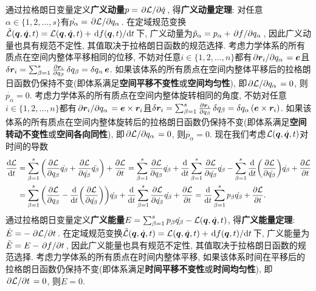 通过拉格朗日变量定义\textbf{广义动量}$ p=\pdv*{\mathcal{L}}{\dot{q}} $, 得\textbf{广义动量定理}: 对任意$ \alpha \in \{1,2,\ldots,s\} $有$ \dot{p_{\alpha}}=\pdv*{\mathcal{L}}{q_{\alpha}} $. 在定域规范变换$ \tilde{\mathcal{L}}(\vb*{q},\dot{\vb*{q}},t)=\mathcal{L}(\vb*{q},\dot{\vb*{q}},t)+\dv*{f(\vb*{q},t)}{t} $下, 广义动量为$ \tilde{p}_{\alpha}=p_{\alpha}+\pdv*{f}{q_{\alpha}} $, 因此广义动量也具有规范不定性, 其值取决于拉格朗日函数的规范选择. 考虑力学体系的所有质点在空间内整体平移相同的位移, 不妨对任意$ i \in \{1,2,\ldots,n\} $都有$ \pdv*{\vb*{r}_i}{q_{\alpha}}=\vb*{e} $且$ \var{\vb*{r}_i} = \sum_{\beta=1}^s \pdv{\vb*{r}_i}{q_{\beta}} \var{q_{\beta}} = \var{q_{\alpha}} \vb*{e} $. 如果该体系的所有质点在空间内整体平移后的拉格朗日函数仍保持不变(即体系满足\textbf{空间平移不变性}或\textbf{空间均匀性}), 即$ \pdv*{\mathcal{L}}{q_{\alpha}}=0 $, 则$ \dot{p_{\alpha}}=0 $. 考虑力学体系的所有质点在空间内整体旋转相同的角度, 不妨对任意$ i \in \{1,2,\ldots,n\} $都有$ \pdv*{\vb*{r}_i}{q_{\alpha}}=\vb*{e} \times \vb*{r}_i $且$ \var{\vb*{r}_i} = \sum_{\beta=1}^s \pdv{\vb*{r}_i}{q_{\beta}} \var{q_{\beta}} = \var{q_{\alpha}} (\vb*{e} \times \vb*{r}_i) $. 如果该体系的所有质点在空间内整体旋转后的拉格朗日函数仍保持不变(即体系满足\textbf{空间转动不变性}或\textbf{空间各向同性}), 即$ \pdv*{\mathcal{L}}{q_{\alpha}}=0 $, 则$ \dot{p_{\alpha}}=0 $. 现在我们考虑$ \mathcal{L}(\vb*{q},\dot{\vb*{q}},t) $对时间的导数
\begin{align*}
    \dv{\mathcal{L}}{t} &= \sum_{\beta=1}^s \bigg(\pdv{\mathcal{L}}{q_{\beta}}\dot{q_{\beta}} + \pdv{\mathcal{L}}{\dot{q_{\beta}}} \ddot{q_{\beta}} \bigg) + \pdv{\mathcal{L}}{t} = \sum_{\beta=1}^s \pdv{\mathcal{L}}{q_{\beta}}\dot{q_{\beta}} + \dv{t} \sum_{\beta=1}^s \pdv{\mathcal{L}}{\dot{q_{\beta}}} \dot{q_{\beta}} - \sum_{\beta=1}^s \dv{t}(\pdv{\mathcal{L}}{\dot{q_{\beta}}}) \dot{q_{\beta}} + \pdv{\mathcal{L}}{t} \\
    &=\sum_{\beta=1}^s \bigg(\pdv{\mathcal{L}}{q_{\beta}} - \dv{t}(\pdv{\mathcal{L}}{\dot{q_{\beta}}}) \bigg)\dot{q_{\beta}} + \dv{t} \sum_{\beta=1}^s \pdv{\mathcal{L}}{\dot{q_{\beta}}} \dot{q_{\beta}} + \pdv{\mathcal{L}}{t} = \dv{t} \sum_{\beta=1}^s p_{\beta} \dot{q_{\beta}} + \pdv{\mathcal{L}}{t}.
\end{align*}
通过拉格朗日变量定义\textbf{广义能量}$ E=\sum_{\beta=1}^s p_{\beta}\dot{q_{\beta}} - \mathcal{L}(\vb*{q},\dot{\vb*{q}},t) $, 得\textbf{广义能量定理}: $ \dot{E}=-\pdv*{\mathcal{L}}{t} $. 在定域规范变换$ \tilde{\mathcal{L}}(\vb*{q},\dot{\vb*{q}},t)=\mathcal{L}(\vb*{q},\dot{\vb*{q}},t)+\dv*{f(\vb*{q},t)}{t} $下, 广义能量为$ \tilde{E}=E-\pdv*{f}{t} $, 因此广义能量也具有规范不定性, 其值取决于拉格朗日函数的规范选择. 考虑力学体系的所有质点在时间内整体平移, 如果该体系时间在平移后的拉格朗日函数仍保持不变(即体系满足\textbf{时间平移不变性}或\textbf{时间均匀性}), 即$ \pdv*{\mathcal{L}}{t}=0 $, 则$ \dot{E}=0 $.

